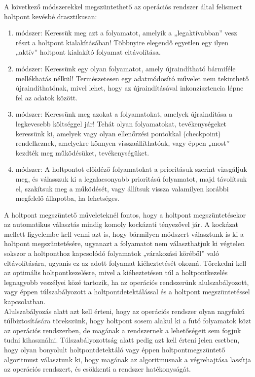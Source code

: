 \documentclass[tikz,12pt,margin=0px]{article}
\begin{document}
    \noindent A következő módszerekkel megszüntethető az operációs rendszer által felismert holtpont kevésbé drasztikusan:
    \begin{enumerate}[topsep=8pt,itemsep=4pt,partopsep=4pt, parsep=4pt]
        \item módszer: Keressük meg azt a folyamatot, amelyik a „legaktívabban” vesz részt a holtpont kialakításában! Többnyire elegendő egyetlen egy ilyen „aktív” holtpont kialakító folyamat eltávolítása.
        \item módszer: Keressünk egy olyan folyamatot, amely újraindítható bármiféle mellékhatás nélkül! Természetesen egy adatmódosító művelet nem tekinthető újraindíthatónak, mivel lehet, hogy az újraindításával inkonzisztencia lépne fel az adatok között.
        \item módszer: Keressünk meg azokat a folyamatokat, amelyek újraindítása a legkevesebb költséggel jár! Tehát olyan folyamatokat, tevékenységeket keressünk ki, amelyek vagy olyan ellenőrzési pontokkal (checkpoint) rendelkeznek, amelyekre könnyen visszaállíthatóak, vagy éppen „most” kezdték meg működésüket, tevékenységüket.
        \item módszer: A holtpontot előidéző folyamatokat a prioritásuk szerint vizsgáljuk meg, és válasszuk ki a legalacsonyabb prioritású folyamatot, majd távolítsuk el, szakítsuk meg a működését, vagy állítsuk vissza valamilyen korábbi megfelelő állapotba, ha lehetséges.
    \end{enumerate}

    \noindent A holtpont megszüntető műveleteknél fontos, hogy a holtpont megszüntetésekor az automatikus választás mindig komoly kockázati tényezővel jár. A kockázat mellett figyelembe kell venni azt is, hogy bármilyen módszert választunk is ki a holtpont megszüntetésére, ugyanazt a folyamatot nem választhatjuk ki végtelen sokszor a holtponthoz kapcsolódó folyamatok „várakozási köréből” való eltávolítására, ugyanis ez az adott folyamat kiéheztetését okozná. Törekedni kell az optimális holtpontkezelésre, mivel a kiéheztetésen túl a holtpontkezelés legnagyobb veszélyei közé tartozik, ha az operációs rendszerünk alulszabályozott, vagy éppen túlszabályozott a holtpontdetektálással és a holtpont megszüntetéssel kapcsolatban.\\

    \noindent Alulszabályozás alatt azt kell érteni, hogy az operációs rendszer olyan nagyfokú túlbiztosítására törekszünk, hogy holtpont sosem alakul ki a futó folyamatok közt az operációs rendszerben, de magának a rendszernek a lehetőségeit sem fogjuk tudni kihasználni. Túlszabályozottság alatt pedig azt kell érteni jelen esetben, hogy olyan bonyolult holtpontdetektáló vagy éppen holtpontmegszüntető algoritmust választunk ki, hogy magának az algoritmusnak a végrehajtása lassítja az operációs rendszert, és csökkenti a rendszer hatékonyságát.
\end{document}
